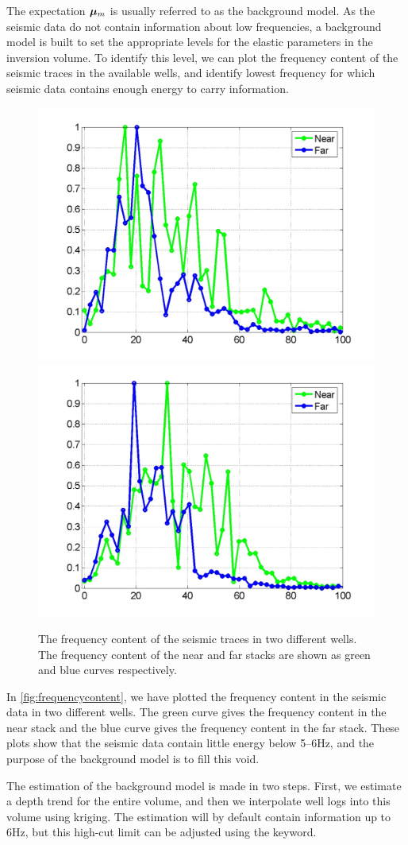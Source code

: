 The expectation $\bm\mu_m$ is usually referred to as the background
model. As the seismic data do not contain information about low
frequencies, a background model is built to set the appropriate
levels for the elastic parameters in the inversion volume. To
identify this level, we can plot the frequency content of the seismic
traces in the available wells, and identify lowest frequency for which
seismic data contains enough energy to carry information.

\begin{figure}
\centering
\includegraphics[width=.49\linewidth]{images/implementation/seismicFrequencies_S1}
\includegraphics[width=.49\linewidth]{images/implementation/seismicFrequencies_S2}
\caption{The frequency content of the seismic traces in two different
         wells. The frequency content of the near and far stacks are
         shown as green and blue curves respectively.}
\label{fig:frequencycontent}
\end{figure}

In \autoref{fig:frequencycontent}, we have plotted the frequency content
in the seismic data in two different wells. The green curve gives the
frequency content in the near stack and the blue curve gives the
frequency content in the far stack. These plots show that the seismic
data contain little energy below 5--6Hz, and the purpose of the
background model is to fill this void.

The estimation of the background model is made in two steps. First,
we estimate a depth trend for the entire volume, and then we
interpolate well logs into this volume using kriging. The estimation
will by default contain information up to 6Hz, but this high-cut limit
can be adjusted using the 
keyword.


